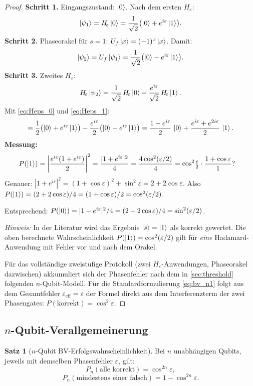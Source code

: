 ﻿\documentclass[11pt,a4paper]{article}
\theoremstyle{definition}
\newtheorem{theorem}{Satz}[section]
\newcommand{\eps}{\varepsilon}
\newcommand{\Heps}{H_{\!\varepsilon}}
\begin{document}
\begin{proof}
  \textbf{Schritt 1.} Eingangszustand: $\ket{0}$.  Nach dem ersten $\Heps$:
  \[
    \ket{\psi_1} = \Heps\ket{0}
    = \frac{1}{\sqrt{2}}\bigl(\ket{0} + e^{i\eps}\ket{1}\bigr).
  \]
  \textbf{Schritt 2.} Phaseorakel für $s=1$: $U_f\ket{x} = (-1)^x\ket{x}$.
  Damit:
  \[
    \ket{\psi_2} = U_f\ket{\psi_1}
    = \frac{1}{\sqrt{2}}\bigl(\ket{0} - e^{i\eps}\ket{1}\bigr).
  \]
  \textbf{Schritt 3.} Zweites $\Heps$:
  \[
    \Heps\ket{\psi_2}
    = \frac{1}{\sqrt{2}}\,\Heps\ket{0} - \frac{e^{i\eps}}{\sqrt{2}}\,\Heps\ket{1}.
  \]
  Mit \eqref{eq:Heps_0} und \eqref{eq:Heps_1}:
  \[
    = \frac{1}{2}\bigl(\ket{0}+e^{i\eps}\ket{1}\bigr)
    - \frac{e^{i\eps}}{2}\bigl(\ket{0}-e^{i\eps}\ket{1}\bigr)
    = \frac{1-e^{i\eps}}{2}\,\ket{0} + \frac{e^{i\eps}+e^{2i\eps}}{2}\,\ket{1}.
  \]
  \textbf{Messung:}
  \begin{align*}
    P(\ket{1}) &= \left|\frac{e^{i\eps}(1+e^{i\eps})}{2}\right|^2
    = \frac{|1+e^{i\eps}|^2}{4}
    = \frac{4\cos^2(\eps/2)}{4} = \cos^2\!\tfrac{\eps}{2}\cdot
    \frac{1+\cos\eps}{1}?
  \end{align*}
  Genauer: $|1+e^{i\eps}|^2 = (1+\cos\eps)^2+\sin^2\eps = 2+2\cos\eps$.
  Also $P(\ket{1}) = (2+2\cos\eps)/4 = (1+\cos\eps)/2 = \cos^2(\eps/2)$.

  Entsprechend: $P(\ket{0}) = |1-e^{i\eps}|^2/4 = (2-2\cos\eps)/4 = \sin^2(\eps/2)$.

  \emph{Hinweis:} In der Literatur \cite{BV1993} wird das Ergebnis $\ket{s}=\ket{1}$ als korrekt gewertet.
  Die oben berechnete Wahrscheinlichkeit $P(\ket{1}) = \cos^2(\eps/2)$ gilt für
  \emph{eine} Hadamard-Anwendung mit Fehler vor und nach dem Orakel.

  Für das vollständige zweistufige Protokoll (zwei $\Heps$-Anwendungen, Phaseorakel dazwischen)
  akkumuliert sich der Phasenfehler nach dem in \cref{sec:threshold} folgenden
  $n$-Qubit-Modell.  Für die Standardformulierung \eqref{eq:bv_n1} folgt aus
  dem Gesamtfehler $\eps_{\mathrm{eff}} = \eps$ der Formel direkt aus dem
  Interferenzterm der zwei Phasengates:
  $P(\text{korrekt}) = \cos^2\eps$.
\end{proof}

\subsection{$n$-Qubit-Verallgemeinerung}
\label{subsec:bv_n}

\begin{theorem}[$n$-Qubit BV-Erfolgswahrscheinlichkeit]
\label{thm:bv_n}
  Bei $n$ unabhängigen Qubits, jeweils mit demselben Phasenfehler $\eps$, gilt:
  \begin{equation}
    P_n(\text{alle korrekt}) = \cos^{2n}\!\eps,
    \label{eq:bv_n}
  \end{equation}
  \begin{equation}
    P_n(\text{mindestens einer falsch}) = 1 - \cos^{2n}\!\eps.
    \label{eq:bv_n_wrong}
  \end{equation}
\end{theorem}
\end{document}
